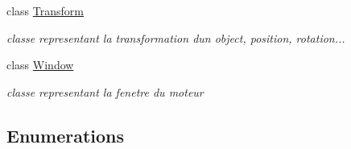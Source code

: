 \begin{DoxyCompactItemize}
class \mbox{\hyperlink{class_beer_engine_1_1_transform}{Transform}}
\begin{DoxyCompactList}\small\item\em classe representant la transformation d\textquotesingle{}un object, position, rotation... \end{DoxyCompactList}\item 
class \mbox{\hyperlink{class_beer_engine_1_1_window}{Window}}
\begin{DoxyCompactList}\small\item\em classe representant la fenetre du moteur \end{DoxyCompactList}\end{DoxyCompactItemize}
\subsection*{Enumerations}
